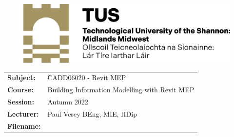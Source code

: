 \documentclass[a4paper, 10pt]{article}
\begin{document}
\lstset{language=HTML,
				basicstyle=\small,
				breaklines=true,
        numbers=left,
        numberstyle=\tiny,
        showstringspaces=false,
        aboveskip=-20pt,
        frame=leftline
        }
				
\begin{figure}
	\centering
	\includegraphics[width=0.5\linewidth]{./SP/img/TUSlogo}
\end{figure}


\begin{tabularx}{\textwidth}{ |l|X| }
	\hline
	\textbf{Subject:} & CADD06020 - Revit MEP\\
	\textbf{Course:} & Building Information Modelling with Revit MEP\\
	\textbf{Session:} & Autumn 2022\\
	\textbf{Lecturer:} & Paul Vesey \footnotesize{BEng, MIE, HDip}\\
	\textbf{Filename:} & \currfilebase\\
	\hline
\end{tabularx}



\vspace{0.25cm}	
\end{document}
